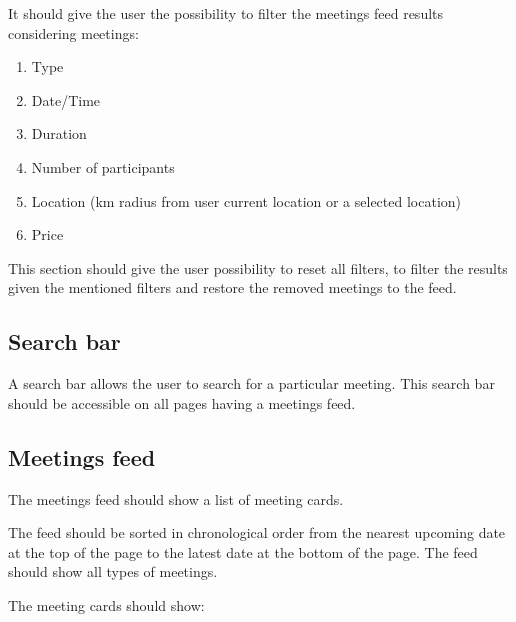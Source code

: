 \documentclass[conference]{IEEEtran}
\begin{document}
It should give the user the possibility to filter the meetings feed results considering meetings:

\begin{enumerate}
    \item Type
    \item Date/Time
    \item Duration
    \item Number of participants
    \item Location (km radius from user current location or a selected location)
    \item Price
\end{enumerate}

This section should give the user possibility to reset all filters, to filter the results given the mentioned filters and restore the removed meetings to the feed.

\subsection{Search bar}

A search bar allows the user to search for a particular meeting.
This search bar should be accessible on all pages having a meetings feed.

\subsection{Meetings feed}

The meetings feed should show a list of meeting cards.

The feed should be sorted in chronological order from the nearest upcoming date at the top of the page to the latest date at the bottom of the page.
The feed should show all types of meetings.

The meeting cards should show:
\end{document}

